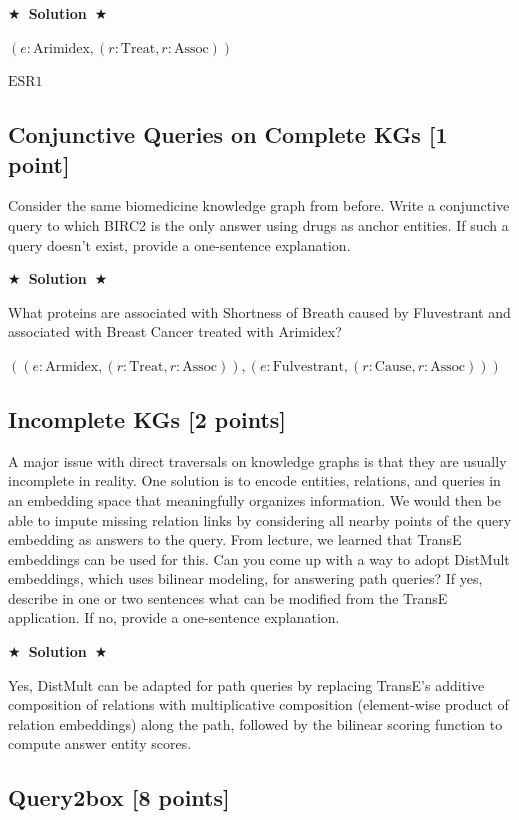 \documentclass[11pt]{article}
\numberwithin{figure}{section}
\newcommand{\Solution}[1]{{\medskip \color{red} \bf $\bigstar$~\sf \textbf{Solution}~$\bigstar$ \sf #1 } \bigskip}
\begin{document}
\Solution{}

$\left( e: \text{Arimidex}, \left( r: \text{Treat}, r: \text{Assoc} \right)\right)$

$\text{ESR1}$


\subsection{Conjunctive Queries on Complete KGs [1 point]}
Consider the same biomedicine knowledge graph from before. Write a conjunctive query to which BIRC2 is the only answer using drugs as anchor entities. If such a query doesn't exist, provide a one-sentence explanation.

\Solution{}

What proteins are associated with Shortness of Breath caused by Fluvestrant and associated with Breast Cancer treated with Arimidex?

$\left((e: \text{Armidex}, (r: \text{Treat}, r: \text{Assoc})), (e: \text{Fulvestrant}, (r: \text{Cause}, r: \text{Assoc} ))  \right)$


\subsection{Incomplete KGs [2 points]}
A major issue with direct traversals on knowledge graphs is that they are usually incomplete in reality. One solution is to encode entities, relations, and queries in an embedding space that meaningfully organizes information. We would then be able to impute missing relation links by considering all nearby points of the query embedding as answers to the query. From lecture, we learned that TransE embeddings can be used for this. Can you come up with a way to adopt DistMult embeddings, which uses bilinear modeling, for answering path queries? If yes, describe in one or two sentences what can be modified from the TransE application. If no, provide a one-sentence explanation.

\Solution{}

Yes, DistMult can be adapted for path queries by replacing TransE's additive composition of relations with multiplicative composition (element-wise product of relation embeddings) along the path, followed by the bilinear scoring function to compute answer entity scores.


\subsection{Query2box [8 points]}
\end{document}
